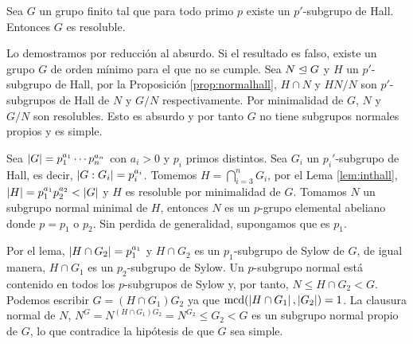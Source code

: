 
\begin{teorema}%
	Sea $G$ un grupo finito tal que para todo primo $p$ existe un $p'$-subgrupo de Hall. Entonces $G$ es resoluble.
	\begin{demostracion}
		Lo demostramos por reducción al absurdo. Si el resultado es falso, existe un grupo $G$ de orden mínimo para el que no se cumple. Sea $N\trianglelefteq G$ y $H$ un $p'$-subgrupo de Hall, por la Proposición \ref{prop:normalhall}, $H\cap N$ y $HN/N$ son $p'$-subgrupos de Hall de $N$ y $G/N$ respectivamente. Por minimalidad de $G$, $N$ y $G/N$ son resolubles. Esto es absurdo y por tanto $G$ no tiene subgrupos normales propios y es simple.
		
		Sea $\left|G\right| = p_1^{a_1}\cdots p_n^{a_n}$ con $a_i>0$ y $p_i$ primos distintos. Sea $G_i$ un $p_i'$-subgrupo de Hall, es decir, $\left|G:G_i\right| = p_i^{a_i}$. Tomemos $H=\bigcap_{i=3}^{n} G_i$, por el Lema \ref{lem:inthall}, $\left|H\right|=p_1^{a_1}p_2^{a_2} < \left|G\right|$ y $H$ es resoluble por minimalidad de $G$. Tomamos $N$ un subgrupo normal minimal de $H$, entonces $N$ es un $p$-grupo elemental abeliano donde $p=p_1$ o $p_2$. Sin perdida de generalidad, supongamos que es $p_1$.
		
		Por el lema, $\left|H\cap G_2\right| = p_1^{a_1}$ y $H\cap G_2$ es un $p_1$-subgrupo de Sylow de $G$, de igual manera, $H\cap G_1$ es un $p_2$-subgrupo de Sylow. Un $p$-subgrupo normal está contenido en todos los $p$-subgrupos de Sylow y, por tanto, $N \leq H\cap G_2 < G$. Podemos escribir $G=(H\cap G_1)G_2$ ya que $\operatorname{mcd}(\left|H\cap G_1\right|,\left|G_2\right|) = 1$. La clausura normal de $N$, $N^{G} = N^{(H\cap G_1)G_2} = N^{G_2}\leq G_2 < G$ es un subgrupo normal propio de $G$, lo que contradice la hipótesis de que $G$ sea simple.
		
	\end{demostracion}
\end{teorema}